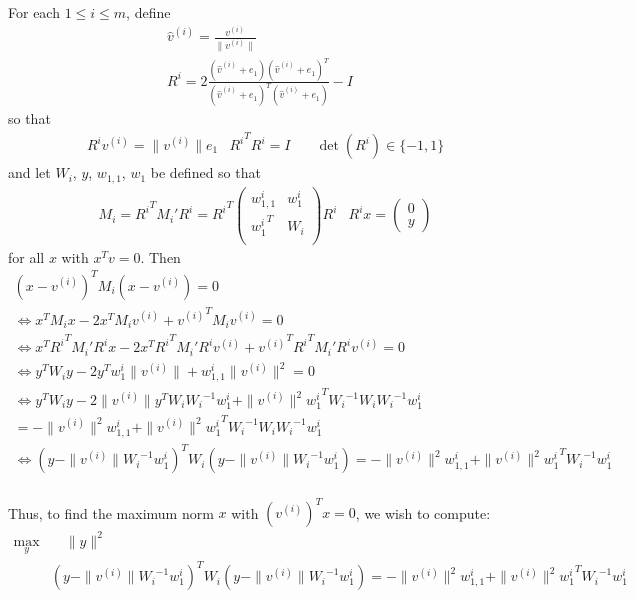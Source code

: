 \documentclass{article}
\theoremstyle{case}
\numberwithin{theorem}{subsection}
\begin{document}
For each $1 \le i \le m$, define
\begin{align*}
\hat v^{(i)} = \frac{v^{(i)}}{\|v^{(i)}\|} \\
R^i = 2\frac{(\hat v^{(i)} + e_1)(\hat v^{(i)} + e_1)^T}{(\hat v^{(i)} + e_1)^T(\hat v^{(i)} + e_1)} - I
\end{align*}
so that
\begin{align*}
& {R^i}v^{(i)} = \|v^{(i)}\|e_1 & {R^i}^T{R^i} = I & \quad \det({R^i}) \in \{-1, 1\}
\end{align*}
and let $W_i$, $y$, $w_{1,1}$, $w_1$ be defined so that
\begin{align*}
& M_i = {R^i}^T M_i' {R^i} = {R^i}^T\left( \begin{array}{cc}
{w_{1,1}^i} & {w_1^i} \\
{w_1^i}^T	& {W_i}  \\
\end{array} \right){R^i} &
{R^i}x = \left(\begin{array}{c}
0 \\
y
\end{array}\right)
\end{align*}
for all $x$ with $x^Tv = 0$.
Then
\begin{align*}
\left(x - {v^{(i)}}\right)^TM_i\left(x - {v^{(i)}}\right) = 0 \\
\Longleftrightarrow x^TM_ix - 2x^TM_i{v^{(i)}} + {v^{(i)}}^TM_i{v^{(i)}} = 0 \\
\Longleftrightarrow x^T{R^i}^TM_i'{R^i}x - 2x^T{R^i}^TM_i'{R^i}{v^{(i)}} + {v^{(i)}}^T{R^i}^TM_i'{R^i}{v^{(i)}} = 0 \\
\Longleftrightarrow y^T{W_i}y - 2y^T{w_1^i}\|v^{(i)}\| + {w_{1,1}^i}\|v^{(i)}\|^2 = 0 \\
\Longleftrightarrow y^T{W_i}y - 2\|v^{(i)}\|y^T{W_i}{W_i}^{-1}{w_1^i} + \|v^{(i)}\|^2{{w_1^i}}^T{W_i}^{-1}{W_i}{W_i}^{-1}{w_1^i} \\
= - \|v^{(i)}\|^2{w_{1,1}^i} + \|v^{(i)}\|^2{{w_1^i}}^T{W_i}^{-1}{W_i}{W_i}^{-1}{w_1^i} \\
\Longleftrightarrow \left(y - \|v^{(i)}\|{W_i}^{-1}{w_1^i}\right)^T{W_i}\left(y - \|v^{(i)}\|{W_i}^{-1}{w_1^i}\right) = - \|v^{(i)}\|^2{w_{1,1}^i} + \|v^{(i)}\|^2{{{w_1^i}}}^T{W_i}^{-1}{{w_1^i}} \\
\end{align*}

Thus, to find the maximum norm $x$ with $\left(v^{(i)}\right)^Tx = 0$, we wish to compute:
\begin{align*}
\max_{y} & \quad \|y\|^2  \\
 & \left(y - \|v^{(i)}\|{W_i}^{-1}{w_1^i}\right)^T{W_i}\left(y - \|v^{(i)}\|{W_i}^{-1}{w_1^i}\right) = - \|v^{(i)}\|^2{w_{1,1}^i} + \|v^{(i)}\|^2{{w_1^i}}^T{W_i}^{-1}{w_1^i}
\end{align*}
\end{document}
